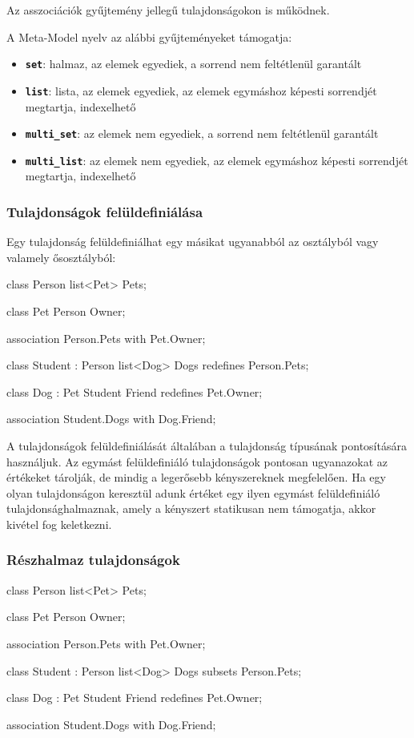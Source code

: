 \documentclass[12pt, a4paper]{report}
\newcommand{\ff}[1]{\textbf{\texttt{#1}}}
\begin{document}
Az asszociációk gyűjtemény jellegű tulajdonságokon is működnek.

A Meta-Model nyelv az alábbi gyűjteményeket támogatja:
\begin{itemize}
	\item \ff{set}: halmaz, az elemek egyediek, a sorrend nem feltétlenül garantált
	\item \ff{list}: lista, az elemek egyediek, az elemek egymáshoz képesti sorrendjét megtartja, indexelhető
	\item \ff{multi\_set}: az elemek nem egyediek, a sorrend nem feltétlenül garantált
	\item \ff{multi\_list}: az elemek nem egyediek, az elemek egymáshoz képesti sorrendjét megtartja, indexelhető
\end{itemize}


\subsubsection{Tulajdonságok felüldefiniálása}

Egy tulajdonság felüldefiniálhat egy másikat ugyanabból az osztályból vagy valamely ősosztályból:

\begin{mmcode}
class Person
{
	list<Pet> Pets;
}

class Pet
{
	Person Owner;
}

association Person.Pets with Pet.Owner;

class Student : Person
{
	list<Dog> Dogs redefines Person.Pets;
}

class Dog : Pet
{
	Student Friend redefines Pet.Owner;
}

association Student.Dogs with Dog.Friend;
\end{mmcode}

A tulajdonságok felüldefiniálását általában a tulajdonság típusának pontosítására használjuk. Az egymást felüldefiniáló tulajdonságok pontosan ugyanazokat az értékeket tárolják, de mindig a legerősebb kényszereknek megfelelően. Ha egy olyan tulajdonságon keresztül adunk értéket egy ilyen egymást felüldefiniáló tulajdonsághalmaznak, amely a kényszert statikusan nem támogatja, akkor kivétel fog keletkezni.

\subsubsection{Részhalmaz tulajdonságok}

\begin{mmcode}
class Person
{
	list<Pet> Pets;
}

class Pet
{
	Person Owner;
}

association Person.Pets with Pet.Owner;

class Student : Person
{
	list<Dog> Dogs subsets Person.Pets;
}

class Dog : Pet
{
	Student Friend redefines Pet.Owner;
}

association Student.Dogs with Dog.Friend;
\end{mmcode}
\end{document}
